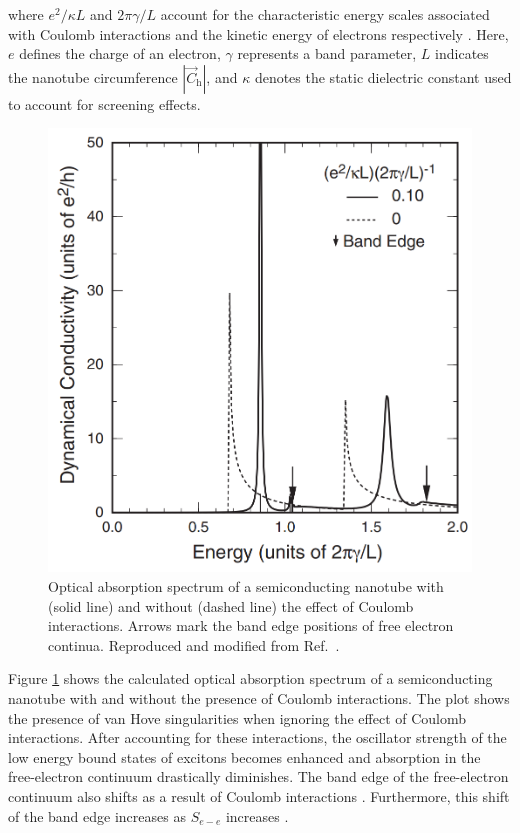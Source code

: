 where $e^2 /\kappa L$ and $2 \pi \gamma / L$ account for the characteristic energy scales associated with Coulomb interactions and the kinetic energy of electrons respectively \cite{ando2005theory}. Here, $e$ defines the charge of an electron, $\gamma$ represents a band parameter, $L$ indicates the nanotube circumference $|\vec{C}_\text{h}|$, and $\kappa$ denotes the static dielectric constant used to account for screening effects.

\begin{figure}[ht]
	\centering
	\includegraphics[scale=0.35]{images/chapter_optical_props/ando_suppression}
	\caption{Optical absorption spectrum of a semiconducting nanotube with (solid line) and without (dashed line) the effect of Coulomb interactions. Arrows mark the band edge positions of free electron continua. Reproduced and modified from Ref.\ \cite{ando2005theory}.}
	\label{fig:ando_suppression}
\end{figure}

Figure \ref{fig:ando_suppression} shows the calculated optical absorption spectrum of a semiconducting nanotube with and without the presence of Coulomb interactions. The plot shows the presence of van Hove singularities when ignoring the effect of Coulomb interactions. After accounting for these interactions, the oscillator strength of the low energy bound states of excitons becomes enhanced and absorption in the free-electron continuum drastically diminishes. The band edge of the free-electron continuum also shifts as a result of Coulomb interactions \cite{ando1997excitons}. Furthermore, this shift of the band edge increases as $S_{e-e}$ increases \cite{ando2005theory}.

